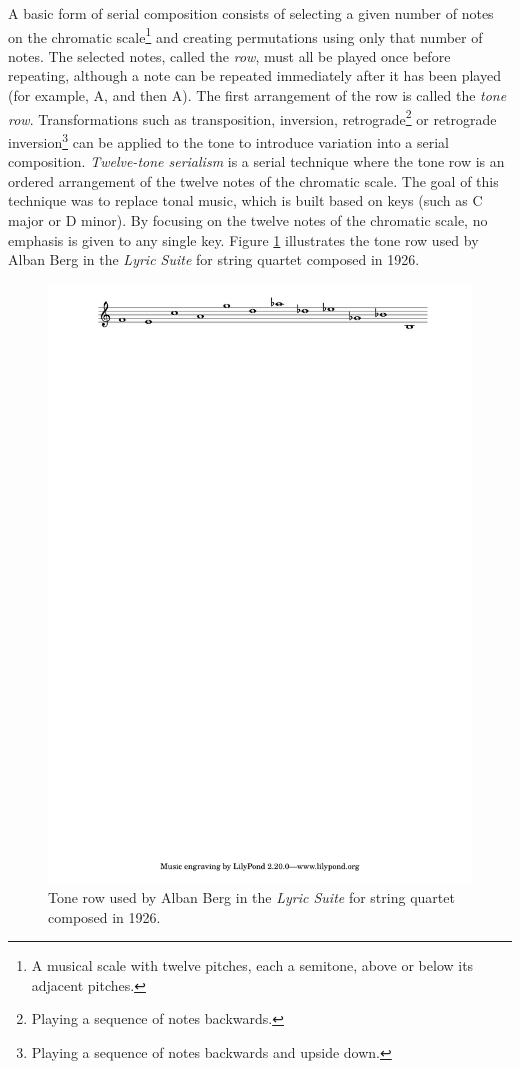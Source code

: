 A basic form of serial composition consists of selecting a given number of notes on the chromatic
scale\footnote{A musical scale with twelve pitches, each a semitone, above or below its adjacent pitches.}
and creating permutations using only that number of notes. The selected notes, called the \textit{row},
must all be played once before repeating, although a note can be repeated immediately after it has been
played (for example, A, and then A). The first arrangement of the row is called the \textit{tone row}.
Transformations such as transposition, inversion, retrograde\footnote{Playing a sequence of notes backwards.}
or retrograde inversion\footnote{Playing a sequence of notes backwards and upside down.} can be applied to
the tone to introduce variation into a serial composition. \textit{Twelve-tone serialism} is a serial
technique where the tone row is an ordered arrangement of the twelve notes of the chromatic scale.
The goal of this technique was to replace tonal music, which is built based on keys (such as C major or D
minor). By focusing on the twelve notes of the chromatic scale, no emphasis is given to any single key.
Figure \ref{fig:serial} illustrates the tone row used by Alban Berg in the \textit{Lyric Suite} for string
quartet composed in 1926.

\begin{figure}[!h]
 \centering
 \includegraphics[width=\columnwidth]{imgs/background/serial.pdf}
 \caption{Tone row used by Alban Berg in the \textit{Lyric Suite} for string quartet composed in 1926.}
 \label{fig:serial}
\end{figure}

